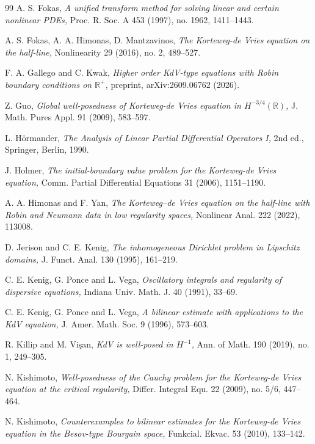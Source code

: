 \documentclass[10pt,reqno]{amsart}
\theoremstyle{remark}
\numberwithin{equation}{section}
\begin{document}
\begin{thebibliography}{99}
 A. S. Fokas, {\it A unified transform method for solving linear and certain nonlinear PDEs,} Proc. R. Soc. A 453 (1997), no. 1962, 1411--1443.

 A. S. Fokas, A. A. Himonas, D. Mantzavinos, {\it The Korteweg-de Vries equation on the half-line,} Nonlinearity 29 (2016), no. 2, 489--527.


 F. A. Gallego and C. Kwak, {\it Higher order KdV-type equations with Robin boundary conditions on $\mathbb R^+$,} preprint, arXiv:2609.06762 (2026).

 Z. Guo, {\it Global well-posedness of Korteweg-de Vries equation in $H^{-3/4}(\mathbb R)$,} J. Math. Pures Appl. 91 (2009), 583--597.



 L. H\"ormander, {\it The Analysis of Linear Partial Differential Operators I,} 2nd ed., Springer, Berlin, 1990.

 J. Holmer, {\it The initial-boundary value problem for the Korteweg-de Vries equation,} Comm. Partial Differential Equations 31 (2006), 1151--1190.


 A. A. Himonas and F. Yan, {\it The Korteweg--de Vries equation on the half-line with Robin and Neumann data in low regularity spaces,} Nonlinear Anal. 222 (2022), 113008.


 D. Jerison and C. E. Kenig, {\it The inhomogeneous Dirichlet problem in Lipschitz domains,} J. Funct. Anal. 130 (1995), 161--219.

 C. E. Kenig, G. Ponce and L. Vega, {\it Oscillatory integrals and regularity of dispersive equations,} Indiana Univ. Math. J. 40 (1991), 33--69.

 C. E. Kenig, G. Ponce and L. Vega, {\it A bilinear estimate with applications to the KdV equation,} J. Amer. Math. Soc. 9 (1996), 573--603.

 R. Killip and M. Vi\c{s}an, {\it KdV is well-posed in $H^{-1}$,} Ann. of Math. 190 (2019), no. 1, 249--305.

 N. Kishimoto, {\it Well-posedness of the Cauchy problem for the Korteweg-de Vries equation at the critical regularity,} Differ. Integral Equ. 22 (2009), no. 5/6, 447--464.

 N. Kishimoto, {\it Counterexamples to bilinear estimates for the Korteweg-de Vries equation in the Besov-type Bourgain space,} Funkcial. Ekvac. 53 (2010), 133--142.



\end{thebibliography}
\end{document}
